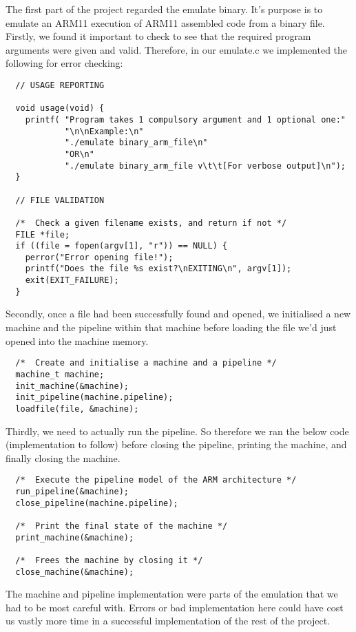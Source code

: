 The first part of the project regarded the emulate binary. It's purpose is to emulate an ARM11 execution of ARM11 assembled code from a binary file.
~\\

Firstly, we found it important to check to see that the required program arguments were given and valid. Therefore, in our emulate.c we implemented the following for error checking:

\begin{verbatim}
  // USAGE REPORTING
  
  void usage(void) {
    printf( "Program takes 1 compulsory argument and 1 optional one:"
            "\n\nExample:\n"
            "./emulate binary_arm_file\n"
            "OR\n"
            "./emulate binary_arm_file v\t\t[For verbose output]\n");
  }
  
  // FILE VALIDATION
  
  /*  Check a given filename exists, and return if not */
  FILE *file;
  if ((file = fopen(argv[1], "r")) == NULL) {
    perror("Error opening file!");
    printf("Does the file %s exist?\nEXITING\n", argv[1]);
    exit(EXIT_FAILURE);
  }
\end{verbatim}

Secondly, once a file had been successfully found and opened, we initialised a new machine and the pipeline within that machine before loading the file we'd just opened into the machine memory.

\begin{verbatim}
  /*  Create and initialise a machine and a pipeline */
  machine_t machine;
  init_machine(&machine);
  init_pipeline(machine.pipeline);
  loadfile(file, &machine);
\end{verbatim}

Thirdly, we need to actually run the pipeline. So therefore we ran the below code (implementation to follow) before closing the pipeline, printing the machine, and finally closing the machine.

\begin{verbatim}
  /*  Execute the pipeline model of the ARM architecture */
  run_pipeline(&machine);
  close_pipeline(machine.pipeline);

  /*  Print the final state of the machine */
  print_machine(&machine);

  /*  Frees the machine by closing it */
  close_machine(&machine);
\end{verbatim}

The machine and pipeline implementation were parts of the emulation that we had to be most careful with. Errors or bad implementation here could have cost us vastly more time in a successful implementation of the rest of the project.
~\\

